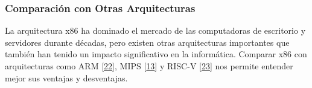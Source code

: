 \documentclass[12pt,twoside]{templates/unerthesis}
\begin{document}
\hypertarget{comparaciuxf3n-con-otras-arquitecturas}{%
\subsubsection{Comparación con Otras Arquitecturas}\label{comparaciuxf3n-con-otras-arquitecturas}}

La arquitectura x86 ha dominado el mercado de las computadoras de escritorio y servidores durante décadas, pero existen otras arquitecturas importantes que también han tenido un impacto significativo en la informática. Comparar x86 con arquitecturas como ARM {[}\protect\hyperlink{ref-patterson2016computer}{22}{]}, MIPS {[}\protect\hyperlink{ref-hennessy_computer_2012}{13}{]} y RISC-V {[}\protect\hyperlink{ref-waterman2014risc}{23}{]} nos permite entender mejor sus ventajas y desventajas.
\end{document}

